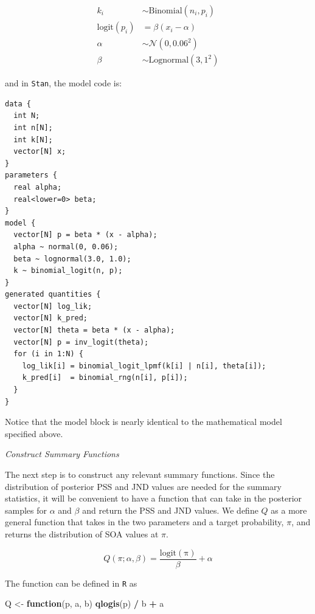 \documentclass[11pt, oneside, openany]{scrbook}
\newenvironment{Shaded}{\begin{snugshade}}{\end{snugshade}}
\newcommand{\ControlFlowTok}[1]{\textcolor[rgb]{0.13,0.29,0.53}{\textbf{#1}}}
\newcommand{\KeywordTok}[1]{\textcolor[rgb]{0.13,0.29,0.53}{\textbf{#1}}}
\newcommand{\NormalTok}[1]{#1}
\newcommand{\OperatorTok}[1]{\textcolor[rgb]{0.81,0.36,0.00}{\textbf{#1}}}
\newcommand{\StringTok}[1]{\textcolor[rgb]{0.31,0.60,0.02}{#1}}
\begin{document}
\begin{align*}
  k_i &\sim \mathrm{Binomial}(n_i, p_i) \\
  \mathrm{logit}(p_i) &= \beta ( x_i - \alpha ) \\
  \alpha &\sim \mathcal{N}(0, 0.06^2) \\
  \beta &\sim \mathrm{Lognormal}(3, 1^2)
\end{align*}

and in \texttt{Stan}, the model code is:

\begin{verbatim}
data {
  int N;
  int n[N];
  int k[N];
  vector[N] x;
}
parameters {
  real alpha;
  real<lower=0> beta;
}
model {
  vector[N] p = beta * (x - alpha);
  alpha ~ normal(0, 0.06);
  beta ~ lognormal(3.0, 1.0);
  k ~ binomial_logit(n, p);
}
generated quantities {
  vector[N] log_lik;
  vector[N] k_pred;
  vector[N] theta = beta * (x - alpha);
  vector[N] p = inv_logit(theta);
  for (i in 1:N) {
    log_lik[i] = binomial_logit_lpmf(k[i] | n[i], theta[i]);
    k_pred[i]  = binomial_rng(n[i], p[i]);
  }
}
\end{verbatim}


Notice that the model block is nearly identical to the mathematical model specified above.

\emph{Construct Summary Functions}

The next step is to construct any relevant summary functions. Since the distribution of posterior PSS and JND values are needed for the summary statistics, it will be convenient to have a function that can take in the posterior samples for \(\alpha\) and \(\beta\) and return the PSS and JND values. We define \(Q\) as a more general function that takes in the two parameters and a target probability, \(\pi\), and returns the distribution of SOA values at \(\pi\).

\begin{equation}
  Q(\pi; \alpha, \beta) = \frac{\mathrm{logit(\pi)}}{\beta} + \alpha
  \label{eq:summfun1}
\end{equation}

The function can be defined in \texttt{R} as

\begin{Shaded}
\begin{Highlighting}[]
\NormalTok{Q <-}\StringTok{ }\ControlFlowTok{function}\NormalTok{(p, a, b) }\KeywordTok{qlogis}\NormalTok{(p) }\OperatorTok{/}\StringTok{ }\NormalTok{b }\OperatorTok{+}\StringTok{ }\NormalTok{a}
\end{Highlighting}
\end{Shaded}
\end{document}

